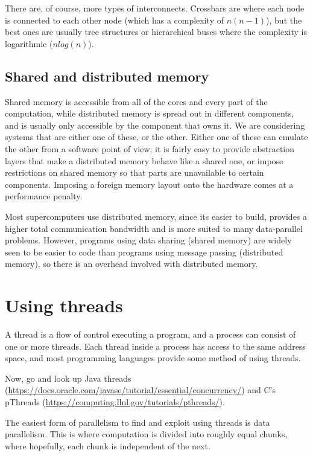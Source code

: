 There are, of course, more types of interconnects. Crossbars are where each node
is connected to each other node (which has a complexity of $n(n-1)$), but the
best ones are usually tree structures or hierarchical buses where the complexity
is logarithmic ($n log(n)$).

\subsection{Shared and distributed memory}

Shared memory is accessible from all of the cores and every part of the
computation, while distributed memory is spread out in different components, and
is usually only accessible by the component that owns it. We are considering
systems that are either one of these, or the other. Either one of these can
emulate the other from a software point of view; it is fairly easy to provide
abstraction layers that make a distributed memory behave like a shared one, or
impose restrictions on shared memory so that parts are unavailable to certain
components. Imposing a foreign memory layout onto the hardware comes at a
performance penalty.

Most supercomputers use distributed memory, since its easier to build, provides
a higher total communication bandwidth and is more suited to many data-parallel
problems. However, programs using data sharing (shared memory) are widely seen
to be easier to code than programs using message passing (distributed memory),
so there is an overhead involved with distributed memory.


\section{Using threads}

A thread is a flow of control executing a program, and a process can consist of
one or more threads. Each thread inside a process has access to the same
address space, and most programming languages provide some method of using
threads.

Now, go and look up Java threads
(\url{https://docs.oracle.com/javase/tutorial/essential/concurrency/}) and C's
pThreads (\url{https://computing.llnl.gov/tutorials/pthreads/}).

The easiest form of parallelism to find and exploit using threads is data
parallelism. This is where computation is divided into roughly equal chunks,
where hopefully, each chunk is independent of the next.

